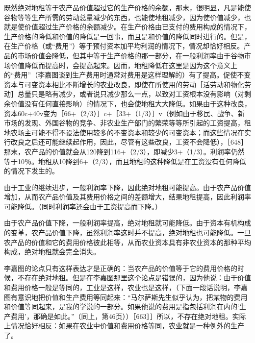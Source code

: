 既然绝对地租等于农产品价值超过它的生产价格的余额，那末，很明显，凡是能使谷物等等生产所需的劳动总量减少的东西，也能使地租减少，因为使价值减少，也就是使价值超过生产价格的余额减少。在生产价格由已支付的费用构成的情况下，生产价格的降低和价值的降低是一回事，而且是和价值的降低同时进行的。但是，在生产价格（或“费用”）等于预付资本加平均利润的情况下，情况却恰好相反。产品的市场价值会降低，但其中等于生产价格的那一部分，在一般利润率由于谷物市场价值降低而提高时，会提高起来。因而，地租降低在这里是因为这个意义上的“费用”（李嘉图谈到生产费用时通常对费用是这样理解的）有了提高。促使不变资本与可变资本相比不断增长的农业改良，即使在所使用的劳动［活劳动和物化劳动］总量只是略有减少，或者说只减少那么一点，以致对工资根本没有影响（对剩余价值没有任何直接影响）的情况下，也会使地租大大降低。如果由于这种改良，资本60c+40v变为［66+（2/3）］c+［33+（1/3）］v（例如由于移民、战争、新市场的发现、外国谷物的竞争、非农业生产部门的繁荣等等所引起的工资提高，租地农场主可能不得不设法使用较多的不变资本和较少的可变资本；而这些情况在实行改良之后还可能继续起作用，因此，尽管有这些改良，工资不会降低），［648］那末，农产品的价值就会从120降到116+（2/3），即减少3+（1/3）。利润率仍然等于10％。地租从10降到6+（2/3），而且地租的这种降低是在工资没有任何降低的情况下发生的。

由于工业的继续进步，一般利润率下降，因此绝对地租可能提高。由于农产品价值增加，从而农产品价值及其费用价格之间的差额增大，结果地租提高，因此利润率可能降低。（同时利润率还会由于工资提高而下降。）

由于农产品价值下降，一般利润率提高，绝对地租就可能降低。由于资本有机构成的变革，农产品价值下降，虽然利润率这时并不提高，绝对地租也可能降低。一旦农产品的价值和它的费用价格彼此相等，从而农业资本具有非农业资本的那种平均构成，绝对地租就会完全消失。

李嘉图的论点只有这样表达才是正确的：当农产品的价值等于它的费用价格的时候，不存在绝对地租。但是在李嘉图那里这个论点是错误的，因为他说：由于价值和费用价格一般是等同的，工业是这样，农业也是这样，（下面一段话说明，李嘉图有意识地把价值和生产费用等同起来：“马尔萨斯先生似乎认为，把某物的费用和价值等同起来，是我的学说的一部分。如果他说的费用是指包括利润在内的‘生产费用’，那确是如此。”（同上，第46页））［663］］所以，不存在绝对地租。实际上情况恰好相反：如果在农业中价值和费用价格等同，农业就是一种例外的生产了。

